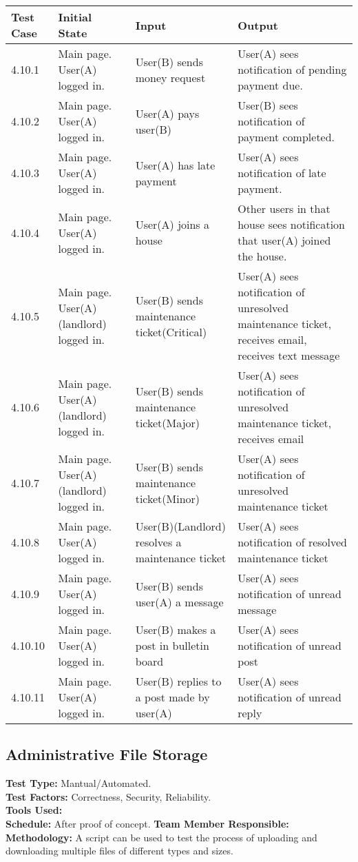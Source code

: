\documentclass[12pt]{article}
\begin{document}
\begin{longtable}{|p{2cm}|p{3cm}|p{5cm}|p{5cm}|}
    \hline
    \textbf{Test Case}  & \textbf{Initial State} & \textbf{Input} & \textbf{Output} \\ \hline
    4.10.1 & Main page. User(A) logged in. & User(B) sends money request & User(A) sees notification of pending payment due.  \\ 
    \hline
    4.10.2 & Main page. User(A) logged in. & User(A) pays user(B) & User(B) sees notification of payment completed.  \\ 
    \hline
    4.10.3 & Main page. User(A) logged in. & User(A) has late payment & User(A) sees notification of late payment.  \\ 
    \hline
    4.10.4 & Main page. User(A) logged in. & User(A) joins a house  & Other users in that house sees notification that user(A) joined the house. \\
    \hline
    4.10.5 & Main page. User(A)(landlord) logged in. & User(B) sends maintenance ticket(Critical) & User(A) sees notification of unresolved maintenance ticket, receives email, receives text message \\
    \hline
    4.10.6 & Main page. User(A)(landlord) logged in. & User(B) sends maintenance ticket(Major) & User(A) sees notification of unresolved maintenance ticket, receives email\\
    \hline
    4.10.7 & Main page. User(A)(landlord) logged in. & User(B) sends maintenance ticket(Minor) & User(A) sees notification of unresolved maintenance ticket \\
    \hline
    4.10.8 & Main page. User(A) logged in. & User(B)(Landlord) resolves a maintenance ticket & User(A) sees notification of resolved maintenance ticket \\
    \hline
    4.10.9 & Main page. User(A) logged in. & User(B) sends user(A) a message & User(A) sees notification of unread message \\
    \hline
    4.10.10 & Main page. User(A) logged in. & User(B) makes a post in bulletin board & User(A) sees notification of unread post \\
    \hline
    4.10.11 & Main page. User(A) logged in. & User(B) replies to a post made by user(A) & User(A) sees notification of unread reply \\
    \hline
\end{longtable}

\subsection{Administrative File Storage}
\textbf{Test Type:} Mantual/Automated. \\
\textbf{Test Factors:} Correctness, Security, Reliability. \\
\textbf{Tools Used:} \\
\textbf{Schedule:} After proof of concept.
\textbf{Team Member Responsible:} \\
\textbf{Methodology:} A script can be used to test the process of uploading and downloading multiple files of different types and sizes.
\end{document}
